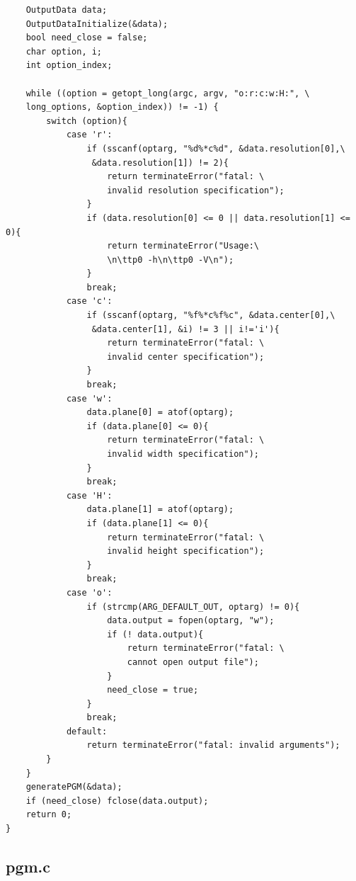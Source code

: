 \documentclass[a4paper,10pt]{article}
\begin{document}
\begin{verbatim}
    OutputData data;
    OutputDataInitialize(&data);
    bool need_close = false;
    char option, i;
    int option_index;

    while ((option = getopt_long(argc, argv, "o:r:c:w:H:", \
    long_options, &option_index)) != -1) {
        switch (option){
            case 'r':
                if (sscanf(optarg, "%d%*c%d", &data.resolution[0],\
                 &data.resolution[1]) != 2){
                    return terminateError("fatal: \
                    invalid resolution specification");
                }
                if (data.resolution[0] <= 0 || data.resolution[1] <= 0){
                    return terminateError("Usage:\
                    \n\ttp0 -h\n\ttp0 -V\n");
                }
                break;
            case 'c':
                if (sscanf(optarg, "%f%*c%f%c", &data.center[0],\
                 &data.center[1], &i) != 3 || i!='i'){
                    return terminateError("fatal: \
                    invalid center specification");
                }
                break;
            case 'w':
                data.plane[0] = atof(optarg);
                if (data.plane[0] <= 0){
                    return terminateError("fatal: \
                    invalid width specification");
                }
                break;
            case 'H':
                data.plane[1] = atof(optarg);
                if (data.plane[1] <= 0){
                    return terminateError("fatal: \
                    invalid height specification");
                }
                break;
            case 'o':
                if (strcmp(ARG_DEFAULT_OUT, optarg) != 0){
                    data.output = fopen(optarg, "w");
                    if (! data.output){
                        return terminateError("fatal: \
                        cannot open output file");
                    }
                    need_close = true;
                }
                break;
            default:
                return terminateError("fatal: invalid arguments");
        }
    }
    generatePGM(&data);
    if (need_close) fclose(data.output);
    return 0;
}

\end{verbatim}

\subsection{pgm.c}
\end{document}
